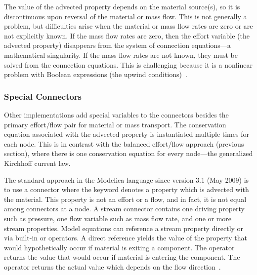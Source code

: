The value of the advected property depends on the material source(s), so it is discontinuous upon reversal of the material or mass flow.  This is not generally a problem, but difficulties arise when the material or mass flow rates are zero or are not explicitly known.  If the mass flow rates are zero, then the effort variable (the advected property) disappears from the system of connection equations---a mathematical singularity.  If the mass flow rates are not known, they must be solved from the connection equations.  This is challenging because it is a nonlinear problem with Boolean expressions (the upwind conditions)~\cite{Franke2009}.


\subsubsection{Special Connectors}
\label{sec:SpecialConnectors}

Other implementations add special variables to the connectors besides the primary effort\slash{}flow pair for material or mass transport.  The conservation equation associated with the advected property is instantiated multiple times for each node.  This is in contrast with the balanced effort\slash{}flow approach (previous section), where there is one conservation equation for every node---the generalized Kirchhoff current law.

The standard approach in the Modelica language since version 3.1 (May 2009) is to use a connector where the  keyword denotes a property which is advected with the material.  This property is not an effort or a flow, and in fact, it is not equal among connectors at a node.  A stream connector contains one driving property such as pressure, one flow variable such as mass flow rate, and one or more stream properties.  Model equations can reference a stream property directly or via built-in  or  operators.  A direct reference yields the value of the property that would hypothetically occur if material is exiting a component.  The  operator returns the value that would occur if material is entering the component.  The  operator returns the actual value which depends on the flow direction~\cite{Modelica3.3}.

